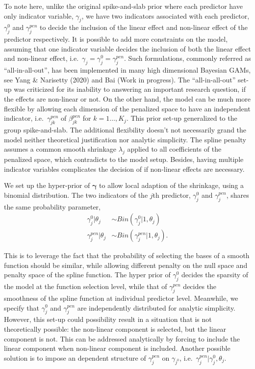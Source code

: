 \documentclass[AMA,STIX1COL,]{WileyNJD-v2}
\begin{document}
To note here, unlike the original spike-and-slab prior where each
predictor have only indicator variable, \(\gamma_j\), we have two
indicators associated with each predictor, \(\gamma^0_j\) and
\(\gamma^{pen}_j\) to decide the inclusion of the linear effect and
non-linear effect of the predictor respectively. It is possible to add
more constraints on the model, assuming that one indicator variable
decides the inclusion of both the linear effect and non-linear effect,
i.e.~\(\gamma_j = \gamma^0_j = \gamma^{pen}_j\). Such formulations,
commonly referred as ``all-in-all-out'', has been implemented in many
high dimensional Bayesian GAMs, see Yang \& Narisetty (2020) and Bai
(Work in progress). The ``all-in-all-out'' set-up was criticized for its
inability to answering an important research question, if the effects
are non-linear or not. On the other hand, the model can be much more
flexible by allowing each dimension of the penalized space to have an
independent indicator, i.e.~\(\gamma^{pen}_{jk}\) of
\(\beta^{pen}_{jk}\) for \(k = 1\dots, K_j\). This prior set-up
generalized to the group spike-and-slab. The additional flexibility
doesn't not necessarily grand the model neither theoretical
justification nor analytic simplicity. The spline penalty assumes a
common smooth shrinkage \(\lambda_j\) applied to all coefficients of the
penalized space, which contradicts to the model setup. Besides, having
multiple indicator variables complicates the decision of if non-linear
effects are necessary.

We set up the hyper-prior of \(\boldsymbol{\gamma}\) to allow local
adaption of the shrinkage, using a binomial distribution. The two
indicators of the \(j\)th predictor, \(\gamma^{0}_j\) and
\(\gamma^{pen}_j\), shares the same probability parameter, \[
\begin{aligned}
\gamma_{j}^{0} | \theta_j &\sim Bin(\gamma^{0}_{j}|1, \theta_j)\\
\gamma_{j}^{pen} | \theta_j &\sim Bin(\gamma^{pen}_{j}|1, \theta_j).
\end{aligned}
\]

This is to leverage the fact that the probability of selecting the bases
of a smooth function should be similar, while allowing different penalty
on the null space and penalty space of the spline function. The hyper
prior of \(\gamma_{j}^{0}\) decides the sparsity of the model at the
function selection level, while that of \(\gamma_{j}^{pen}\) decides the
smoothness of the spline function at individual predictor level.
Meanwhile, we specify that \(\gamma_{j}^0\) and \(\gamma_{j}^{pen}\) are
independently distributed for analytic simplicity. However, this set-up
could possibility result in a situation that is not theoretically
possible: the non-linear component is selected, but the linear component
is not. This can be addressed analytically by forcing to include the
linear component when non-linear component is included. Another possible
solution is to impose an dependent structure of \(\gamma_{j}^{pen}\) on
\(\gamma_{j^{0}}\), i.e.~\(\gamma_j^{pen}|\gamma_{j}^{0}, \theta_j\).
\end{document}
